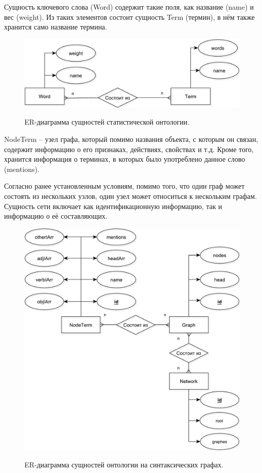 Сущность ключевого слова (Word) содержит такие поля, как название (name) и вес (weight). Из таких элементов состоит сущность Term (термин), в нём также хранится само название термина.
\begin{figure}[h]
	\begin{center}
		{\includegraphics[scale = 0.6]{img/er/pdf/ontology.pdf}}
		\caption{ER-диаграмма сущностей статистической онтологии.}
		\label{fig37:image}
	\end{center}
\end{figure}

NodeTerm -- узел графа, который помимо названия объекта, с которым он связан, содержит информацию о его признаках, действиях, свойствах и т.д. Кроме того, хранится информация о терминах, в которых было употреблено данное слово (mentions). 

Согласно ранее установленным условиям, помимо того, что один граф может состоять из нескольких узлов, один узел может относиться к нескольким графам. 
Сущность сети включает как идентификационную информацию, так и информацию о её составляющих.

\begin{figure}[h]
	\begin{center}
		{\includegraphics[scale = 0.6]{img/er/pdf/net.pdf}}
		\caption{ER-диаграмма сущностей онтологии на синтаксических графах.}
		\label{fig38:image}
	\end{center}
\end{figure}

